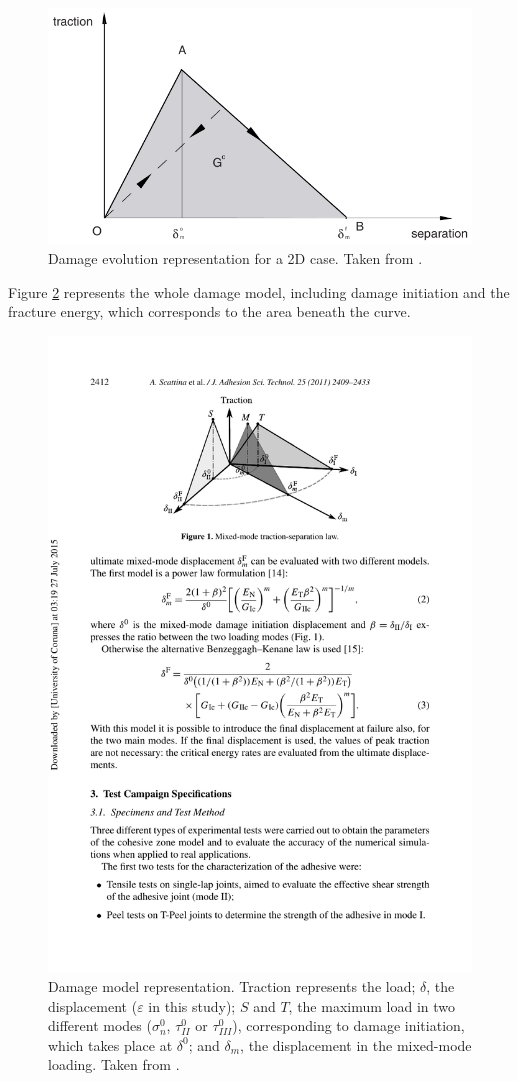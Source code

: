 \documentclass[
documentsize = a4, %
font = cmr, %
typesize = 11, %
printmode = true,
onehalfspacing = true,
language = en, %
titlepage = udciccp, %
degree = pt, %
dedication = true,
acknowledgements = true,
abstract-en = true,
abstract-es = false,
abstract-ga = false,
epigraphs = true,
toc = true,
lof = true,
lot = true,
frontmatterintoc = false,
notation = false,
minimal = false,
]{UDCthesis}
\begin{document}
\begin{figure}
	\centering
	\includegraphics[width=0.7\linewidth]{IMG_CUTRES/damage_evolution_manual.pdf}
	\caption[Damage evolution representation for a 2D case.]{Damage evolution representation for a 2D case. Taken from \citep{Abaqus613Manual}.}
	\label{fig:damage_evo2D}
\end{figure}

Figure \ref{fig:damage} represents the whole damage model, including damage initiation and the fracture energy, which corresponds to the area beneath the curve.

\begin{figure}
	\centering
	\includegraphics[width=0.7\linewidth]{IMG_CUTRES/scattina_quads}
	\caption[Damage model representation.]{Damage model representation. Traction represents the load; $\delta$, the displacement ($\varepsilon$ in this study); $S$ and $T$, the maximum load in two different modes ($\sigma_{n}^{0}$, $\tau_{II}^{0}$ or $\tau_{III}^{0}$), corresponding to damage initiation, which takes place at $\delta^0$; and $\delta_m$, the displacement in the mixed-mode loading. Taken from \citet{Scattina2011}.}
	\label{fig:damage}
\end{figure}
\end{document}
